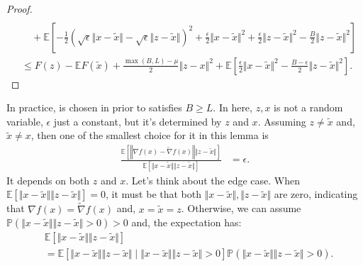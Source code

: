 \documentclass[12pt]{article}
\newcommand{\expect}{\ensuremath{\mathbb E}}
\newcommand{\prob}{\ensuremath{\mathbb P}}
\begin{document}
\begin{proof}
\begin{align*}
                    \\ &\quad 
                    + \expect\left[
                        - \frac{1}{2}\left(
                            \sqrt{\epsilon}\Vert x - \tilde x\Vert - \sqrt{\epsilon}\Vert z - \tilde x\Vert
                        \right)^2
                        + \frac{\epsilon}{2}\Vert x - \tilde x\Vert^2 + \frac{\epsilon}{2}\Vert z - \tilde x\Vert^2
                        - \frac{B}{2} \Vert z - \tilde x\Vert^2
                    \right]
                \\
                &\le 
                F(z) - \expect F(\tilde x) + \frac{\max(B, L) - \mu}{2}\Vert z - x\Vert^2 
                + \expect\left[
                    \frac{\epsilon}{2}\Vert x - \tilde x\Vert^2
                    - \frac{B - \epsilon}{2} \Vert z - \tilde x\Vert^2
                \right]. 
            \end{align*}
        \end{proof}
        In practice, is chosen in prior to satisfies $B \ge L$. 
        In here, $z, x$ is not a random variable, $\epsilon$ just a constant, but it's determined by $z$ and $x$. 
        Assuming $z \neq \tilde x$ and, $\tilde x \neq x$, then one of the smallest choice for it in this lemma is
        \begin{align*}
            \frac{
                \expect \left[
                    \left\Vert \nabla f(x) - \tilde \nabla f(x) \right\Vert \Vert z - \tilde x\Vert
                \right]
            }{
            \expect \left[
                \Vert x - \tilde x\Vert\Vert z - \tilde x\Vert
            \right]
            } &= \epsilon. 
        \end{align*}
        It depends on both $z$ and $x$. 
        Let's think about the edge case. 
        When $\expect [\Vert x - \tilde x\Vert\Vert z - \tilde x\Vert] = 0$, it must be that both $\Vert x - \tilde x\Vert,\Vert z - \tilde x\Vert$ are zero, indicating that $\nabla f(x) = \tilde \nabla f(x)$ and, $x = \tilde x = z$. 
        Otherwise, we can assume $\prob(\Vert x - \tilde x\Vert\Vert z - \tilde x\Vert > 0) > 0$ and, the expectation has: 
        \begin{align*}
            & \expect \left[
                \Vert x - \tilde x\Vert\Vert z - \tilde x\Vert
            \right] 
            \\&= 
            \expect\left[
                \Vert x - \tilde x\Vert\Vert z - \tilde x\Vert \;|\; 
                \Vert x - \tilde x\Vert\Vert z - \tilde x\Vert > 0
            \right]\prob(
                \Vert x - \tilde x\Vert\Vert z - \tilde x\Vert > 0
            ). 
        \end{align*}
\end{document}
